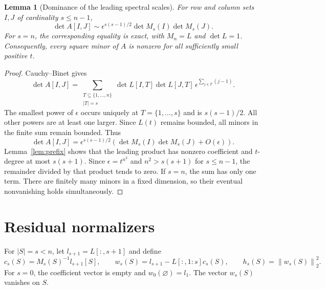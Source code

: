 \documentclass[11pt]{article}
\newtheorem{lemma}[theorem]{Lemma}
\theoremstyle{remark}
\newcommand{\eps}{\epsilon}
\newcommand{\norm}[1]{\left\lVert#1\right\rVert}
\begin{document}
\begin{lemma}[Dominance of the leading spectral scales]\label{lem:CB}
For row and column sets $I,J$ of cardinality $s\le n-1$,
\begin{equation}\label{eq:CB-asymptotic}
 \det A[I,J]
 \sim \eps^{s(s-1)/2}\det M_s(I)\det M_s(J).
\end{equation}
For $s=n$, the corresponding equality is exact, with $M_n=L$ and
$\det L=1$. Consequently, every square minor of $A$ is nonzero for all
sufficiently small positive $t$.
\end{lemma}
\begin{proof}
Cauchy--Binet gives
\[
 \det A[I,J]=\sum_{\substack{T\subseteq\{1,\ldots,n\}\\|T|=s}}
 \det L[I,T]\det L[J,T]\,
 \eps^{\sum_{j\in T}(j-1)}.
\]
The smallest power of $\eps$ occurs uniquely at $T=\{1,\ldots,s\}$ and is
$s(s-1)/2$. All other powers are at least one larger. Since $L(t)$ remains
bounded, all minors in the finite sum remain bounded. Thus
\[
 \det A[I,J]=\eps^{s(s-1)/2}
 \left(\det M_s(I)\det M_s(J)+O(\eps)\right).
\]
Lemma~\ref{lem:prefix} shows that the leading product has nonzero coefficient
and $t$-degree at most $s(s+1)$. Since $\eps=t^{n^2}$ and
$n^2>s(s+1)$ for $s\le n-1$, the remainder divided by that product tends to
zero. If $s=n$, the sum has only one term. There are finitely many minors in
a fixed dimension, so their eventual nonvanishing holds simultaneously.
\end{proof}

\section{Residual normalizers}

For $|S|=s<n$, let $l_{s+1}=L[:,s+1]$ and define
\begin{equation}\label{eq:w}
 c_s(S)=M_s(S)^{-1}l_{s+1}[S],\qquad
 w_s(S)=l_{s+1}-L[:,1\!:\!s]c_s(S),\qquad
 h_s(S)=\norm{w_s(S)}_2^2.
\end{equation}
For $s=0$, the coefficient vector is empty and $w_0(\varnothing)=l_1$.
The vector $w_s(S)$ vanishes on $S$.
\end{document}
